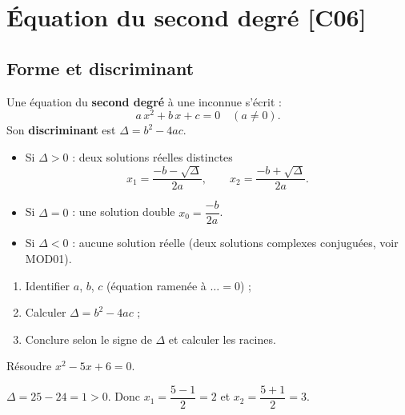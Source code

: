 \documentclass[a4paper,11pt]{article}
\begin{document}
\newpage
\section{Équation du second degré \hfill {\normalsize\color{uimmred}[C06]}}

\subsection{Forme et discriminant}

\begin{definition}
Une équation du \textbf{second degré} à une inconnue s'écrit :
\[
a\,x^2 + b\,x + c = 0 \quad (a \neq 0).
\]
Son \textbf{discriminant} est $\Delta = b^2 - 4ac$.
\end{definition}

\begin{theoreme}
\begin{itemize}
  \item Si $\Delta > 0$ : deux solutions réelles distinctes
  \[
  x_1 = \frac{-b - \sqrt{\Delta}}{2a}, \qquad x_2 = \frac{-b + \sqrt{\Delta}}{2a}.
  \]
  \item Si $\Delta = 0$ : une solution double $x_0 = \dfrac{-b}{2a}$.
  \item Si $\Delta < 0$ : aucune solution réelle (deux solutions complexes conjuguées, voir MOD01).
\end{itemize}
\end{theoreme}

\begin{methode}[-- Résolution]
\begin{enumerate}
  \item Identifier $a$, $b$, $c$ (équation ramenée à $\dots = 0$) ;
  \item Calculer $\Delta = b^2 - 4ac$ ;
  \item Conclure selon le signe de $\Delta$ et calculer les racines.
\end{enumerate}
\end{methode}

\begin{exemple}
Résoudre $x^2 - 5x + 6 = 0$.

$\Delta = 25 - 24 = 1 > 0$. Donc $x_1 = \dfrac{5 - 1}{2} = 2$ et $x_2 = \dfrac{5 + 1}{2} = 3$.
\end{exemple}
\end{document}
